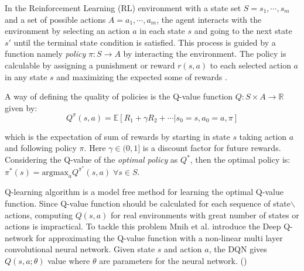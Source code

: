 In the Reinforcement Learning (RL) environment with a state set $S = s_1, \cdots, s_m$ and a  set of possible actions $A = a_1, \cdots, a_m$, the agent interacts with the environment by selecting an action $a$ in each state $s$ and going to the next state $s'$ until the terminal state condition is satisfied. This process is guided by a function namely \textit{policy} $\pi : S \longrightarrow A$ by interacting the environment. The policy is calculable by assigning a punishment or reward $r(s, a)$ to each selected action $a$ in any state $s$ and maximizing the expected some of rewards \cite{sutton1998}.  

A way of defining the quality of policies is the Q-value function $Q : S \times A \longrightarrow \mathbb{R}$ given by: 
$$Q^{\pi}(s, a) = \mathbb{E}[R_1+ \gamma R_2 + \cdots | s_0 = s, a_0 =a, \pi]$$

which is the expectation of sum of rewards by starting in state $s$ taking action $a$ and following policy $\pi$. Here $\gamma \in (0, 1]$ is a discount factor for future rewards. Considering the Q-value of the \textit{optimal policy} as $Q^*$, then the optimal policy is: $\pi^*(s) = \text{argmax}_a Q^{\pi^*}(s, a) \; \forall  s \in S$.  

Q-learning algorithm \cite{sutton1998} is a model free method for learning the optimal Q-value function. Since Q-value function should be calculated for each sequence of state$\backslash$actions, computing $Q(s, a)$ for real environments with great number of states or actions  is impractical.  To tackle this problem Mnih et al. introduce the Deep Q-network for approximating the Q-value function with a non-linear multi layer convolutional neural network.  Given state $s$ and action $a$, the DQN gives $Q(s, a; \theta)$ value where $\theta$ are parameters for the neural network. ()


